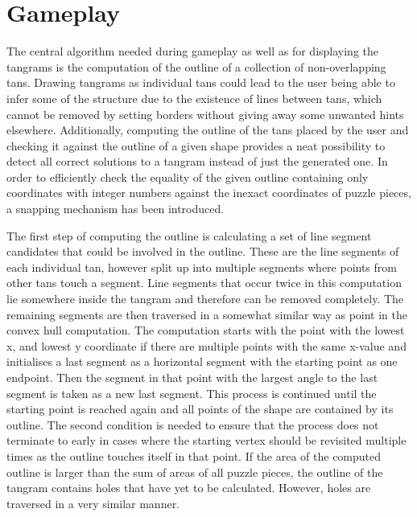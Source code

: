 \section{Gameplay}

The central algorithm needed during gameplay as well as for displaying the tangrams is the computation of the outline of a collection of non-overlapping tans. Drawing tangrams as individual tans could lead to the user being able to infer some of the structure due to the existence of lines between tans, which cannot be removed by setting borders without giving away some unwanted hints elsewhere. Additionally, computing the outline of the tans placed by the user and checking it against the outline of a given shape provides a neat possibility to detect all correct solutions to a tangram instead of just the generated one. In order to efficiently check the equality of the given outline containing only coordinates with integer numbers against the inexact coordinates of puzzle pieces, a snapping mechanism has been introduced.

The first step of computing the outline is calculating a set of line segment candidates that could be involved in the outline. These are the line segments of each individual tan, however split up into multiple segments where points from other tans touch a segment. Line segments that occur twice in this computation lie somewhere inside the tangram and therefore can be removed completely. The remaining segments are then traversed in a somewhat similar way as point in the convex hull computation. The computation starts with the point with the lowest x, and lowest y coordinate if there are multiple points with the same x-value and initialises a last segment as a horizontal segment with the starting point as one endpoint. Then the segment in that point with the largest angle to the last segment is taken as a new last segment. This process is continued until the starting point is reached again and all points of the shape are contained by its outline. The second condition is needed to ensure that the process does not terminate to early in cases where the starting vertex should be revisited multiple times as the outline touches itself in that point. If the area of the computed outline is larger than the sum of areas of all puzzle pieces, the outline of the tangram contains holes that have yet to be calculated. However, holes are traversed in a very similar manner.
 \label{outline}
